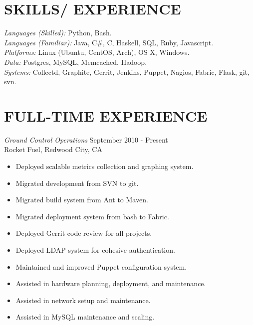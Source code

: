 \documentclass[line,margin]{res}
\begin{document}
\address{Foster City, CA 94404}
\address{\sl tabletcorry@gmail.com}

\begin{resume}
 
\section{SKILLS/ EXPERIENCE} {\sl Languages (Skilled):} Python, Bash.\\
                {\sl Languages (Familiar):} Java, C\#, C, Haskell, SQL, Ruby, Javascript.\\
                {\sl Platforms:} Linux (Ubuntu, CentOS, Arch), OS X, Windows. \\
                {\sl Data:} Postgres, MySQL, Memcached, Hadoop. \\
                {\sl Systems:} Collectd, Graphite, Gerrit, Jenkins, Puppet, Nagios, Fabric, Flask, git, svn.
 
\section{FULL-TIME EXPERIENCE} 
                {\sl Ground Control Operations} \hfill September 2010 - Present \\
                Rocket Fuel, Redwood City, CA
                \begin{itemize}  \itemsep -2pt
                 \item Deployed scalable metrics collection and graphing system.
                 \item Migrated development from SVN to git.
                 \item Migrated build system from Ant to Maven.
                 \item Migrated deployment system from bash to Fabric.
                 \item Deployed Gerrit code review for all projects.
                 \item Deployed LDAP system for cohesive authentication.
                 \item Maintained and improved Puppet configuration system.
                 \item Assisted in hardware planning, deployment, and maintenance.
                 \item Assisted in network setup and maintenance.
                 \item Assisted in MySQL maintenance and scaling.
                \end{itemize}


\end{resume}
\end{document}
